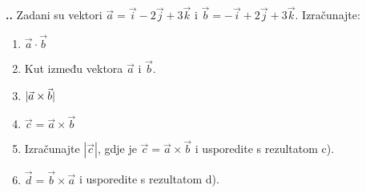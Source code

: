 
\noindent 
\textbf{
\thecjelina.\thezadatak.}
Zadani su vektori $\vec{a}=\vec{i}-2\vec{j}+3\vec{k} $ 
i $\vec{b}= -\vec{i}+ 2\vec{j}+3\vec{k}  $. Izračunajte:
\begin{enumerate}[label=\alph*)]
 \item $\vec{a} \cdot \vec{b}  $
 \item Kut između vektora $\vec{a}$ i $\vec{b}$.
 \item $\arrowvert \vec{a} \times \vec{b}  \arrowvert$ 
 \item $\vec{c}= \vec{a} \times \vec{b}  $ 
 \item Izračunajte $ | \vec{c} |$, gdje je $\vec{c}=\vec{a} \times \vec{b}$ i usporedite s rezultatom c).
 \item $\vec{d}=\vec{b}\times\vec{a}$ i usporedite s rezultatom d).
\end{enumerate}
